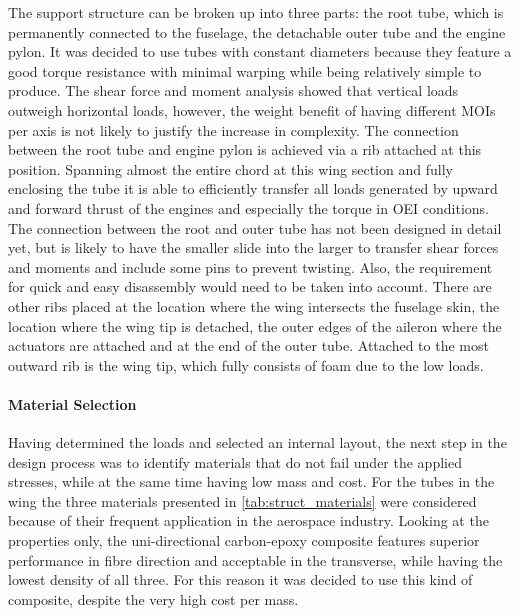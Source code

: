 The support structure can be broken up into three parts: the root tube, which is permanently connected to the fuselage, the detachable outer tube and the engine pylon. It was decided to use tubes with constant diameters because they feature a good torque resistance with minimal warping while being relatively simple to produce. The shear force and moment analysis showed that vertical loads outweigh horizontal loads, however, the weight benefit of having different MOIs per axis is not likely to justify the increase in complexity.
The connection between the root tube and engine pylon is achieved via a rib attached at this position. Spanning almost the entire chord at this wing section and fully enclosing the tube it is able to efficiently transfer all loads generated by upward and forward thrust of the engines and especially the torque in OEI  conditions. The connection between the root and outer tube has not been designed in detail yet, but is likely to have the smaller slide into the larger to transfer shear forces and moments and include some pins to prevent twisting. Also, the requirement for quick and easy disassembly would need to be taken into account. 
There are other ribs placed at the location where the wing intersects the fuselage skin, the location where the wing tip is detached, the outer edges of the aileron where the actuators are attached and at the end of the outer tube. Attached to the most outward rib is the wing tip, which fully consists of foam due to the low loads.

\paragraph{Material Selection}

Having determined the loads and selected an internal layout, the next step in the design process was to identify materials that do not fail under the applied stresses, while at the same time having low mass and cost. For the tubes in the wing the three materials presented in \autoref{tab:struct_materials} were considered because of their frequent application in the aerospace industry. Looking at the properties only, the uni-directional carbon-epoxy composite features superior performance in fibre direction and acceptable in the transverse, while having the lowest density of all three. For this reason it was decided to use this kind of composite, despite the very high cost per mass.     


